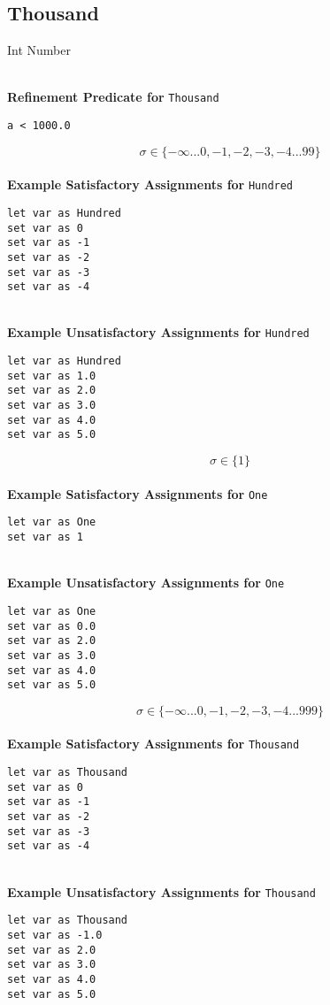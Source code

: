 \subsection{Thousand}
Int Number

\textbf{\\ Refinement Predicate for } \texttt{Thousand}
\begin{verbatim}
a < 1000.0
\end{verbatim}

$$\sigma \in \{ -\infty ... 0, -1, -2, -3, -4 ... 99 \}$$ \ \
\textbf{\\ Example Satisfactory Assignments for } \texttt{Hundred}
\begin{verbatim}
let var as Hundred
set var as 0
set var as -1
set var as -2
set var as -3
set var as -4
\end{verbatim}


\textbf{\\ Example Unsatisfactory Assignments for } \texttt{Hundred}
\begin{verbatim}
let var as Hundred
set var as 1.0
set var as 2.0
set var as 3.0
set var as 4.0
set var as 5.0
\end{verbatim}


$$\sigma \in \{ 1 \}$$ \ \
\textbf{\\ Example Satisfactory Assignments for } \texttt{One}
\begin{verbatim}
let var as One
set var as 1
\end{verbatim}


\textbf{\\ Example Unsatisfactory Assignments for } \texttt{One}
\begin{verbatim}
let var as One
set var as 0.0
set var as 2.0
set var as 3.0
set var as 4.0
set var as 5.0
\end{verbatim}


$$\sigma \in \{ -\infty ... 0, -1, -2, -3, -4 ... 999 \}$$ \ \
\textbf{\\ Example Satisfactory Assignments for } \texttt{Thousand}
\begin{verbatim}
let var as Thousand
set var as 0
set var as -1
set var as -2
set var as -3
set var as -4
\end{verbatim}


\textbf{\\ Example Unsatisfactory Assignments for } \texttt{Thousand}
\begin{verbatim}
let var as Thousand
set var as -1.0
set var as 2.0
set var as 3.0
set var as 4.0
set var as 5.0
\end{verbatim}


